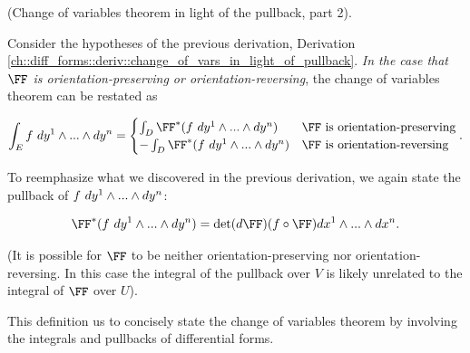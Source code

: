 \begin{theorem}
     (Change of variables theorem in light of the pullback, part 2).
    
    Consider the hypotheses of the previous derivation, Derivation \ref{ch::diff_forms::deriv::change_of_vars_in_light_of_pullback}. \textit{In the case that $\FF$ is orientation-preserving or orientation-reversing}, the change of variables theorem can be restated as
    
    \begin{align*}
        \int_E f \spc dy^1 \wedge ... \wedge dy^n
        =
        \begin{cases}
            \int_D \FF^*(f \spc dy^1 \wedge ... \wedge dy^n) & \text{$\FF$ is orientation-preserving} \\
            -\int_D \FF^*(f \spc dy^1 \wedge ... \wedge dy^n) & \text{$\FF$ is orientation-reversing}
        \end{cases}.
    \end{align*}
    
    To reemphasize what we discovered in the previous derivation, we again state the pullback of $f \text{ } dy^1 \wedge ... \wedge dy^n$:
    
    \begin{align*}
        \FF^*(f \spc dy^1 \wedge ... \wedge dy^n) = \det(d\FF) (f \circ \FF) dx^1 \wedge ... \wedge dx^n.
    \end{align*}
    
    (It is possible for $\FF$ to be neither orientation-preserving nor orientation-reversing. In this case the integral of the pullback over $V$ is likely unrelated to the integral of $\FF$ over $U$).
\end{theorem}

This definition us to concisely state the change of variables theorem by involving the integrals and pullbacks of differential forms.

